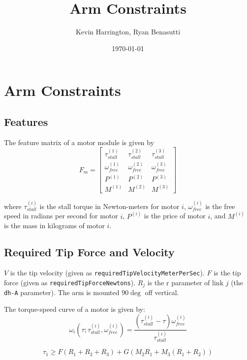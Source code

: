 \documentclass{article}
\title{Arm Constraints}
\author{Kevin Harrington, Ryan Benasutti}
\date{\today}
\begin{document}
\maketitle

\FloatBarrier
\section{Arm Constraints}

\FloatBarrier
\subsection{Features}

The feature matrix of a motor module is given by
\begin{equation}
    F_m =
    \begin{bmatrix}
        \tau_{stall}^{(1)} & \tau_{stall}^{(2)} & \tau_{stall}^{(3)} \\[6pt]
        \omega_{free}^{(1)} & \omega_{free}^{(2)} & \omega_{free}^{(3)} \\[6pt]
        P^{(1)} & P^{(2)} & P^{(3)} \\[6pt]
        M^{(1)} & M^{(2)} & M^{(3)}
    \end{bmatrix}
\end{equation}

where $\tau_{stall}^{(i)}$ is the stall torque in Newton-meters for motor $i$,
$\omega_{free}^{(i)}$ is the free speed in radians per second for motor $i$,
$P^{(i)}$ is the price of motor $i$, and $M^{(i)}$ is the mass in kilograms of
motor $i$.

\FloatBarrier
\subsection{Required Tip Force and Velocity}

$V$ is the tip velocity (given as \texttt{requiredTipVelocityMeterPerSec}). $F$
is the tip force (given as \texttt{requiredTipForceNewtons}). $R_j$ is the r
parameter of link $j$ (the \texttt{dh-A} parameter). The arm is mounted $90
\deg$ off vertical.

The torque-speed curve of a motor is given by:
\begin{equation}
    \omega_i(\tau; \tau_{stall}^{(i)}, \omega_{free}^{(i)}) = \frac{(\tau_{stall}^{(i)} - \tau)\omega_{free}^{(i)}}{\tau_{stall}^{(i)}}
\end{equation}

\begin{equation}
    \tau_1 \geq F(R_1 + R_2 + R_3) + G(M_2 R_1 + M_3 (R_1 + R_2))
\end{equation}
\end{document}

